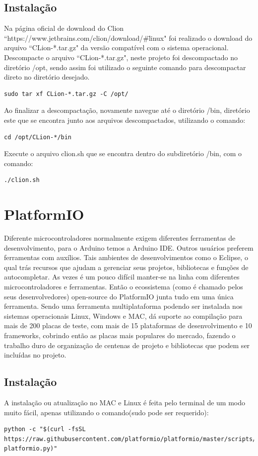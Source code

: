 \documentclass[a4paper,12pt,portuguese]{ufms-cpcx}
\begin{document}
\subsection{Instalação}
Na página oficial de download do Clion ``https://www.jetbrains.com/clion/download/\#\=linux" foi realizado o download do arquivo ``CLion-*.tar.gz" da versão compatível com o sistema operacional. Descompacte o arquivo ``CLion-*.tar.gz", neste projeto foi descompactado no diretório /opt, sendo assim foi utilizado o seguinte comando para descompactar direto no diretório desejado.
\begin{lstlisting}
sudo tar xf CLion-*.tar.gz -C /opt/
\end{lstlisting}
Ao finalizar a descompactação, novamente navegue até o diretório /bin, diretório este que se encontra junto aos arquivos descompactados, utilizando o comando: 
\begin{lstlisting}
cd /opt/CLion-*/bin
\end{lstlisting}
Execute o arquivo clion.sh que se encontra dentro do subdiretório /bin, com o comando:
\begin{lstlisting}
./clion.sh
\end{lstlisting}

\section{PlatformIO}
Diferente microcontroladores normalmente exigem diferentes ferramentas de desenvolvimento, para o Arduino temos a Arduino IDE. Outros usuários preferem ferramentas com auxílios. Tais ambientes de desenvolvimentos como o Eclipse, o qual trás recursos que ajudam a gerenciar seus projetos, bibliotecas e funções de autocompletar. As vezes é um pouco difícil manter-se na linha com diferentes microcontroladores e ferramentas. Então o ecossistema (como é chamado pelos seus desenvolvedores) open-source do PlatformIO junta tudo em uma única ferramenta. Sendo uma ferramenta multiplataforma podendo ser instalada nos sistemas operacionais Linux, Windows e MAC, dá suporte ao compilação para mais de 200 placas de teste, com mais de 15 plataformas de desenvolvimento e 10 frameworks, cobrindo então as placas mais populares do mercado, fazendo o trabalho duro de organização de centenas de projeto e bibliotecas que podem ser incluídas no projeto.

\subsection{Instalação}
A instalação ou atualização no MAC e Linux é feita pelo terminal de um modo muito fácil, apenas utilizando o comando(sudo pode ser requerido): 
\begin{lstlisting}
python -c "$(curl -fsSL https://raw.githubusercontent.com/platformio/platformio/master/scripts/get-platformio.py)"
\end{lstlisting}
\end{document}
